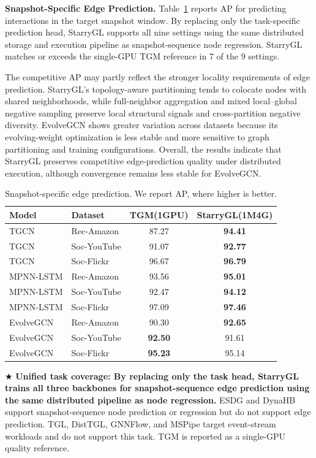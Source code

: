 \noindent\textbf{Snapshot-Specific Edge Prediction.}
Table~\ref{tab:snapshot_edge_quality} reports AP for predicting
interactions in the target snapshot window. By replacing only the
task-specific prediction head, StarryGL supports all nine
settings using the same distributed storage and execution pipeline as
snapshot-sequence node regression. StarryGL matches or exceeds the
single-GPU TGM reference in 7 of the 9 settings.

The competitive AP may partly reflect the stronger locality
requirements of edge prediction. StarryGL's topology-aware
partitioning tends to colocate nodes with shared neighborhoods, while
full-neighbor aggregation and mixed local--global negative sampling
preserve local structural signals and cross-partition negative
diversity. EvolveGCN shows greater variation across datasets because
its evolving-weight optimization is less stable and more sensitive to
graph partitioning and training configurations. Overall, the results
indicate that StarryGL preserves competitive edge-prediction quality
under distributed execution, although convergence remains less stable
for EvolveGCN.
  \begin{table}[htbp]
  \centering
  \caption{Snapshot-specific edge prediction. We report AP, where higher
  is better.}
  \vspace{-10pt}
  \label{tab:snapshot_edge_quality}
  \small
  \begin{tabular}{llcc}
  \toprule
  Model & Dataset & TGM(1GPU) & StarryGL(1M4G) \\
  \midrule
  TGCN & Rec-Amazon  & 87.27 & \textbf{94.41} \\
  TGCN & Soc-YouTube & 91.07 & \textbf{92.77} \\
  TGCN & Soc-Flickr  & 96.67 & \textbf{96.79} \\
  \midrule
  MPNN-LSTM & Rec-Amazon  & 93.56 & \textbf{95.01} \\
  MPNN-LSTM & Soc-YouTube & 92.47 & \textbf{94.12} \\
  MPNN-LSTM & Soc-Flickr  & 97.09 & \textbf{97.46} \\
  \midrule
  EvolveGCN & Rec-Amazon  & 90.30 & \textbf{92.65} \\
  EvolveGCN & Soc-YouTube & \textbf{92.50} & 91.61 \\
  EvolveGCN & Soc-Flickr  & \textbf{95.23} & 95.14 \\
  \bottomrule
  \end{tabular}
  \begin{minipage}{\linewidth}
    \scriptsize
    $\bigstar$ \textbf{Unified task coverage: By replacing only the task head,
StarryGL trains all three backbones for snapshot-sequence edge
prediction using the same distributed pipeline as node regression.}
ESDG and DynaHB support snapshot-sequence node prediction or
regression but do not support edge prediction. TGL, DistTGL,
GNNFlow, and MSPipe target event-stream workloads and do not support
this task. TGM is reported as a single-GPU quality reference.
    \end{minipage}
  \vspace{-10pt}
  \end{table}
  
